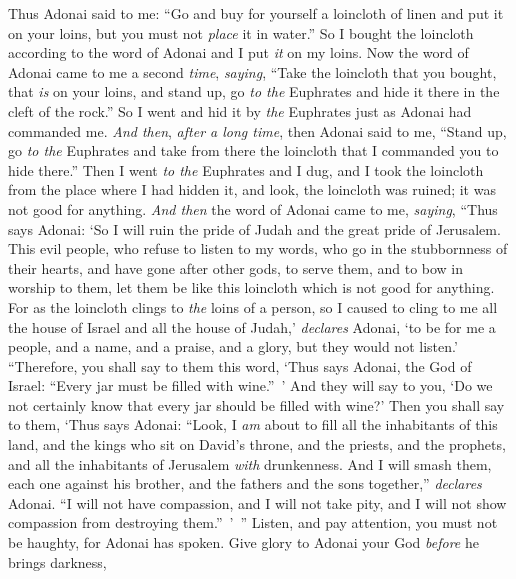 \begin{biblechapter} %
 Thus Adonai said to me: “Go and buy for yourself a loincloth of linen and put it on your loins, but you must not \textit{place} it in water.”
\verse So I bought the loincloth according to the word of Adonai and I put \textit{it} on my loins.
\verse Now the word of Adonai came to me a second \textit{time}, \textit{saying},
\verse “Take the loincloth that you bought, that \textit{is} on your loins, and stand up, go \textit{to the} Euphrates and hide it there in the cleft of the rock.”
\verse So I went and hid it by \textit{the} Euphrates just as Adonai had commanded me.
\verse \textit{And then}, \textit{after a long time}, then Adonai said to me, “Stand up, go \textit{to the} Euphrates and take from there the loincloth that I commanded you to hide there.”
\verse Then I went \textit{to the} Euphrates and I dug, and I took the loincloth from the place where I had hidden it, and look, the loincloth was ruined; it was not good for anything.
\verse \textit{And then} the word of Adonai came to me, \textit{saying},
\verse “Thus says Adonai: ‘So I will ruin the pride of Judah and the great pride of Jerusalem.
\verse This evil people, who refuse to listen to my words, who go in the stubbornness of their hearts, and have gone after other gods, to serve them, and to bow in worship to them, let them be like this loincloth which is not good for anything.
\verse For as the loincloth clings to \textit{the} loins of a person, so I caused to cling to me all the house of Israel and all the house of Judah,’ \textit{declares} Adonai, ‘to be for me a people, and a name, and a praise, and a glory, but they would not listen.’
\verse “Therefore, you shall say to them this word, ‘Thus says Adonai, the God of Israel: “Every jar must be filled with wine.” ’ And they will say to you, ‘Do we not certainly know that every jar should be filled with wine?’
\verse Then you shall say to them, ‘Thus says Adonai: “Look, I \textit{am} about to fill all the inhabitants of this land, and the kings who sit on David’s throne, and the priests, and the prophets, and all the inhabitants of Jerusalem \textit{with} drunkenness.
\verse And I will smash them, each one against his brother, and the fathers and the sons together,” \textit{declares} Adonai. “I will not have compassion, and I will not take pity, and I will not show compassion from destroying them.” ’ ”
\verse Listen, and pay attention, 
you must not be haughty, for Adonai has spoken.
\verse Give glory to Adonai your God \textit{before} he brings darkness, 

\end{biblechapter}
